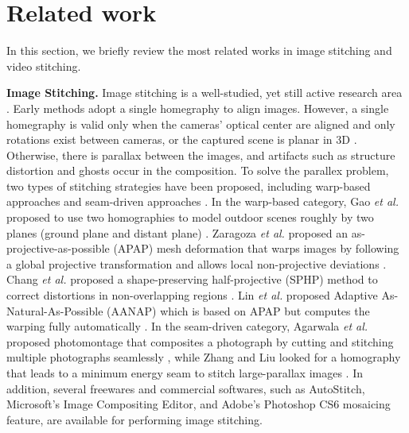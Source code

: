 \documentclass[conference]{IEEEtran}
\begin{document}
\section{Related work}
\label{sec:related}

In this section, we briefly review the most related works in image stitching and video stitching.


{\bf Image Stitching.} Image stitching is a well-studied, yet still active research 
area \cite{paragios2006handbook, brown2007automatic,hartley2003multiple,lin2011smoothly, chang2014shape, zaragoza2013projective,lin2015adaptive,zhang2014parallax, gao2013seam, agarwala2004interactive,gao2011constructing}. 
Early methods adopt a single homegraphy to align images.
However, a single homegraphy is valid only when the cameras' optical center are aligned and only rotations exist between cameras, or the captured scene is planar in 3D \cite{hartley2003multiple}. 
Otherwise, there is parallax between the images, and artifacts such as structure distortion and ghosts occur in the composition. 
To solve the parallex problem, two types of stitching strategies have been proposed, including warp-based approaches \cite{lin2011smoothly, chang2014shape, zaragoza2013projective} and seam-driven approaches \cite{zhang2014parallax, gao2013seam, agarwala2004interactive}. 
In the warp-based category, 
Gao \textit{et al.} proposed to use two homographies to model outdoor scenes roughly by two planes (ground plane and distant plane) \cite{gao2011constructing}.
Zaragoza \textit{et al.} proposed an as-projective-as-possible (APAP) mesh deformation that warps
images by following a global projective transformation and allows local non-projective 
deviations \cite{zaragoza2013projective}.
Chang \textit{et al.} proposed a shape-preserving half-projective (SPHP) method
to correct distortions in non-overlapping regions \cite{chang2014shape}. 
Lin \textit{et al.} proposed Adaptive As-Natural-As-Possible (AANAP) 
which is based on APAP but computes the warping fully automatically \cite{lin2015adaptive}.
In the seam-driven category, Agarwala \textit{et al.}
proposed photomontage that composites a photograph by
cutting and stitching multiple photographs seamlessly \cite{agarwala2004interactive},
while Zhang and Liu looked for a homography that leads to a
minimum energy seam to stitch large-parallax images \cite{zhang2014parallax}.
In addition, several freewares and commercial softwares, such as AutoStitch, Microsoft’s Image Compositing Editor, and Adobe's Photoshop CS6 mosaicing feature, are available for performing image stitching.
\end{document}
